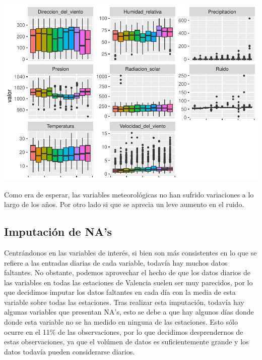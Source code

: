 \documentclass[notspecified,article,submit,moreauthors,pdftex]{Definitions/mdpi}
\begin{document}
\includegraphics{Memoria_files/figure-latex/unnamed-chunk-22-1.pdf}

Como era de esperar, las variables meteorológicas no han sufrido
variaciones a lo largo de los años. Por otro lado si que se aprecia un
leve aumento en el ruido.

\hypertarget{imputaciuxf3n-de-nas}{%
\subsection{Imputación de NA's}\label{imputaciuxf3n-de-nas}}

Centrándonos en las variables de interés, si bien son más consistentes
en lo que se refiere a las entradas diarias de cada variable, todavía
hay muchos datos faltantes. No obstante, podemos aprovechar el hecho de
que los datos diarios de las variables en todas las estaciones de
Valencia suelen ser muy parecidos, por lo que decidimos imputar los
datos faltantes en cada día con la media de esta variable sobre todas
las estaciones. Tras realizar esta imputación, todavía hay algunas
variables que presentan NA's, esto se debe a que hay algunos días donde
donde esta variable no se ha medido en ninguna de las estaciones. Esto
sólo ocurre en el 11\% de las observaciones, por lo que decidimos
desprendernos de estas observaciones, ya que el volúmen de datos es
suficientemente grande y los datos todavía pueden considerarse diarios.
\end{document}
